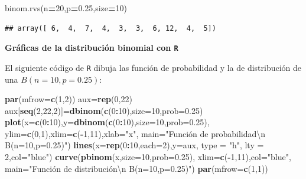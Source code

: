 \documentclass[]{book}
\newenvironment{Shaded}{\begin{snugshade}}{\end{snugshade}}
\newcommand{\CharTok}[1]{\textcolor[rgb]{0.31,0.60,0.02}{#1}}
\newcommand{\DataTypeTok}[1]{\textcolor[rgb]{0.13,0.29,0.53}{#1}}
\newcommand{\DecValTok}[1]{\textcolor[rgb]{0.00,0.00,0.81}{#1}}
\newcommand{\FloatTok}[1]{\textcolor[rgb]{0.00,0.00,0.81}{#1}}
\newcommand{\KeywordTok}[1]{\textcolor[rgb]{0.13,0.29,0.53}{\textbf{#1}}}
\newcommand{\NormalTok}[1]{#1}
\newcommand{\OperatorTok}[1]{\textcolor[rgb]{0.81,0.36,0.00}{\textbf{#1}}}
\newcommand{\StringTok}[1]{\textcolor[rgb]{0.31,0.60,0.02}{#1}}
\begin{document}
\begin{Shaded}
\begin{Highlighting}[]
\NormalTok{binom.rvs(n}\OperatorTok{=}\DecValTok{20}\NormalTok{,p}\OperatorTok{=}\FloatTok{0.25}\NormalTok{,size}\OperatorTok{=}\DecValTok{10}\NormalTok{)}
\end{Highlighting}
\end{Shaded}

\begin{verbatim}
## array([ 6,  4,  7,  4,  3,  3,  6, 12,  4,  5])
\end{verbatim}

\textbf{Gráficas de la distribución binomial con \texttt{R}}

El siguiente código de \texttt{R} dibuja las función de probabilidad y la de distribución de una \(B(n=10,p=0.25)\):

\begin{Shaded}
\begin{Highlighting}[]
\KeywordTok{par}\NormalTok{(}\DataTypeTok{mfrow=}\KeywordTok{c}\NormalTok{(}\DecValTok{1}\NormalTok{,}\DecValTok{2}\NormalTok{))}
\NormalTok{aux=}\KeywordTok{rep}\NormalTok{(}\DecValTok{0}\NormalTok{,}\DecValTok{22}\NormalTok{)}
\NormalTok{aux[}\KeywordTok{seq}\NormalTok{(}\DecValTok{2}\NormalTok{,}\DecValTok{22}\NormalTok{,}\DecValTok{2}\NormalTok{)]=}\KeywordTok{dbinom}\NormalTok{(}\KeywordTok{c}\NormalTok{(}\DecValTok{0}\OperatorTok{:}\DecValTok{10}\NormalTok{),}\DataTypeTok{size=}\DecValTok{10}\NormalTok{,}\DataTypeTok{prob=}\FloatTok{0.25}\NormalTok{)}
\KeywordTok{plot}\NormalTok{(}\DataTypeTok{x=}\KeywordTok{c}\NormalTok{(}\DecValTok{0}\OperatorTok{:}\DecValTok{10}\NormalTok{),}\DataTypeTok{y=}\KeywordTok{dbinom}\NormalTok{(}\KeywordTok{c}\NormalTok{(}\DecValTok{0}\OperatorTok{:}\DecValTok{10}\NormalTok{),}\DataTypeTok{size=}\DecValTok{10}\NormalTok{,}\DataTypeTok{prob=}\FloatTok{0.25}\NormalTok{),}
  \DataTypeTok{ylim=}\KeywordTok{c}\NormalTok{(}\DecValTok{0}\NormalTok{,}\DecValTok{1}\NormalTok{),}\DataTypeTok{xlim=}\KeywordTok{c}\NormalTok{(}\OperatorTok{-}\DecValTok{1}\NormalTok{,}\DecValTok{11}\NormalTok{),}\DataTypeTok{xlab=}\StringTok{"x"}\NormalTok{,}
  \DataTypeTok{main=}\StringTok{"Función de probabilidad}\CharTok{\textbackslash{}n}\StringTok{ B(n=10,p=0.25)"}\NormalTok{)}
\KeywordTok{lines}\NormalTok{(}\DataTypeTok{x=}\KeywordTok{rep}\NormalTok{(}\DecValTok{0}\OperatorTok{:}\DecValTok{10}\NormalTok{,}\DataTypeTok{each=}\DecValTok{2}\NormalTok{),}\DataTypeTok{y=}\NormalTok{aux, }\DataTypeTok{type =} \StringTok{"h"}\NormalTok{, }\DataTypeTok{lty =} \DecValTok{2}\NormalTok{,}\DataTypeTok{col=}\StringTok{"blue"}\NormalTok{)}
\KeywordTok{curve}\NormalTok{(}\KeywordTok{pbinom}\NormalTok{(x,}\DataTypeTok{size=}\DecValTok{10}\NormalTok{,}\DataTypeTok{prob=}\FloatTok{0.25}\NormalTok{),}
  \DataTypeTok{xlim=}\KeywordTok{c}\NormalTok{(}\OperatorTok{-}\DecValTok{1}\NormalTok{,}\DecValTok{11}\NormalTok{),}\DataTypeTok{col=}\StringTok{"blue"}\NormalTok{,}
  \DataTypeTok{main=}\StringTok{"Función de distribución\textbackslash{}n B(n=10,p=0.25)"}\NormalTok{)}
\KeywordTok{par}\NormalTok{(}\DataTypeTok{mfrow=}\KeywordTok{c}\NormalTok{(}\DecValTok{1}\NormalTok{,}\DecValTok{1}\NormalTok{))}
\end{Highlighting}
\end{Shaded}
\end{document}
